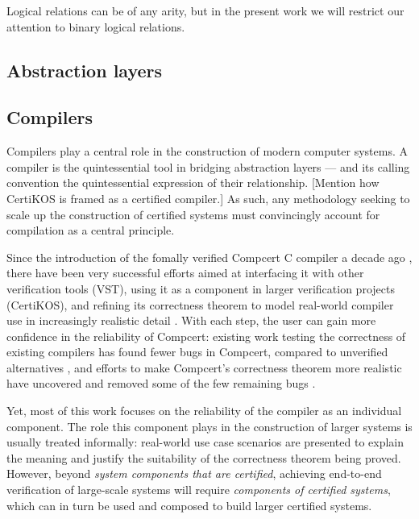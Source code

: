 \documentclass[acmsmall,timestamp,review]{acmart}
\begin{document}
Logical relations can be of any arity,
but in the present work
we will restrict our attention to
binary logical relations.


\subsection{Abstraction layers} %


\subsection{Compilers} %

Compilers play a central role
in the construction of modern computer systems.
A compiler is the quintessential tool
in bridging abstraction layers ---
and its calling convention
the quintessential expression of their relationship.
[Mention how CertiKOS is framed as a certified compiler.]
As such,
any methodology seeking to scale up
the construction of certified systems
must convincingly account for compilation
as a central principle.

Since the introduction of the fomally verified
Compcert C compiler a decade ago \cite{compcert},
there have been very successful efforts aimed at
interfacing it with other verification tools (VST),
using it as a component in larger verification projects (CertiKOS),
and refining its correctness theorem
to model real-world compiler use
in increasingly realistic detail
\cite{qompcert,sepcompcert,compcompcert,compcerttso,compcertshm}.
With each step,
the user can gain more confidence in the reliability of Compcert:
existing work testing the correctness of existing compilers
has found fewer bugs in Compcert,
compared to unverified alternatives \cite{csmith},
and efforts to make Compcert's correctness theorem more realistic
have uncovered and removed some of the few remaining bugs \cite{sepcompcert}.

Yet, most of this work
focuses on the reliability of the compiler
as an individual component.
The role this component plays in the construction of larger systems
is usually treated informally:
real-world use case scenarios are presented
to explain the meaning and justify the suitability
of the correctness theorem being proved.
However,
beyond \emph{system components that are certified},
achieving end-to-end verification of large-scale systems
will require \emph{components of certified systems},
which can in turn be used and composed
to build larger certified systems.
\end{document}
